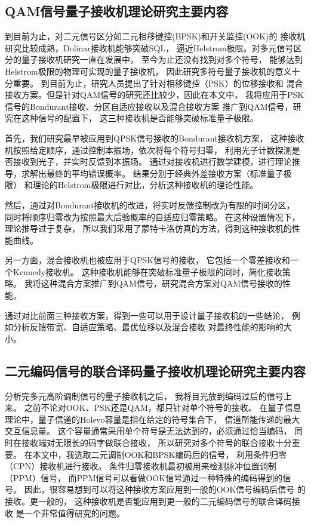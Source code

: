\subsection{QAM信号量子接收机理论研究主要内容}
到目前为止，对二元信号区分如二元相移键控(BPSK)和开关监控(OOK)的
接收机研究比较成熟，Dolinar接收机能够突破SQL，
逼近Helstrom极限。对多元信号区分的量子接收机研究一直在发展中，
至今为止还没有找到对多个符号，
能够达到Helstrom极限的物理可实现的量子接收机，
因此研究多符号量子接收机的意义十分重要。
到目前为止，研究人员提出了针对相移键控（PSK）的位移接收和
混合接收方案。但是针对QAM信号的研究还比较少，因此在本文中，
我将应用于PSK信号的Bondurant接收、分区自适应接收以及混合接收方案
推广到QAM信号，研究在这种信号的配置下，
这三种接收机是否能够突破标准量子极限。


首先，我们研究最早被应用到QPSK信号接收的Bondurant接收机方案，
这种接收机按照给定顺序，通过控制本振场，依次将每个符号归零，
利用光子计数探测是否接收到光子，并实时反馈到本振场。
通过对接收机进行数学建模，进行理论推导，求解出最终的平均错误概率。
结果分别于经典外差接收方案（标准量子极限）
和理论的Helstrom极限进行对比，分析这种接收机的理论性能。

然后，通过对Bondurant接收机的改进，将实时反馈控制改为有限的时间分区，
同时将顺序归零改为按照最大后验概率的自适应归零策略。
在这种设置情况下，理论推导过于复杂，
所以我们采用了蒙特卡洛仿真的方法，得到这种接收机的性能曲线。

另一方面，混合接收机也被应用于QPSK信号的接收，
它包括一个零差接收和一个Kennedy接收机。
这种接收机能够在突破标准量子极限的同时，简化接收策略。
我将这种混合方案推广到QAM信号，研究混合方案对QAM信号接收的性能。

通过对比前面三种接收方案，得到一些可以用于设计量子接收机的一些结论，
例如分析反馈带宽、自适应策略、最优位移以及混合接收
对最终性能的影响的大小。

\subsection{二元编码信号的联合译码量子接收机理论研究主要内容}

分析完多元高阶调制信号的量子接收机之后，
我将目光放到编码过后的信号上来。
之前不论对OOK、PSK还是QAM，都只针对单个符号的接收。
在量子信息理论中，量子信道的Holevo容量是指在给定的符号集合下，
信道所能传递的最大交互信息量。
这个容量通常采用单个符号是无法达到的，必须通过恰当编码，
同时在接收端对无限长的码字做联合接收，
所以研究对多个符号的联合接收十分重要。
在本文中，我选取二元调制OOK和BPSK编码后的信号，
利用条件归零（CPN）接收机进行接收。
条件归零接收机最初被用来检测脉冲位置调制（PPM）信号，
而PPM信号可以看做OOK信号通过一种特殊的编码得到的信号。
因此，很容易想到可以将这种接收方案应用到一般的OOK信号编码后信号
的接收。更一般的，
这种接收机是否能应用到更一般的二元编码信号的联合译码接收
是一个非常值得研究的问题。

